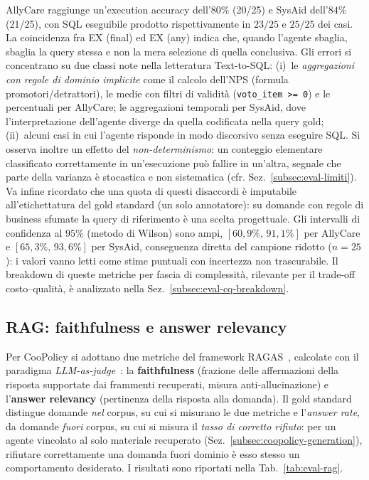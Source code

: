 AllyCare raggiunge un'execution accuracy dell'$80\%$ (20/25) e SysAid dell'$84\%$ (21/25), con SQL eseguibile prodotto rispettivamente in $23/25$ e $25/25$ dei casi. 
La coincidenza fra EX (final) ed EX (any) indica che, quando l'agente sbaglia, sbaglia la query stessa e non la mera selezione di quella conclusiva. 
Gli errori si concentrano su due classi note nella letteratura Text-to-SQL: (i)~le \emph{aggregazioni con regole di dominio implicite} come 
il calcolo dell'NPS (formula promotori/detrattori), le medie con filtri di validità (\texttt{voto\_item >= 0}) e le percentuali per AllyCare; 
le aggregazioni temporali per SysAid, dove l'interpretazione dell'agente diverge da quella codificata nella query gold; 
(ii)~alcuni casi in cui l'agente risponde in modo discorsivo senza eseguire SQL. Si osserva inoltre un effetto del \emph{non-determinismo}: 
un conteggio elementare classificato correttamente in un'esecuzione può fallire in un'altra, segnale che parte della varianza è stocastica e non sistematica 
(cfr. Sez.~\ref{subsec:eval-limiti}). Va infine ricordato che una quota di questi disaccordi è imputabile all'etichettatura del gold standard (un solo annotatore): 
su domande con regole di business sfumate la query di riferimento è una scelta progettuale. Gli intervalli di confidenza al $95\%$ (metodo di Wilson) sono ampi, $[60{,}9\%,\,91{,}1\%]$ per AllyCare
e $[65{,}3\%,\,93{,}6\%]$ per SysAid, conseguenza diretta del campione ridotto ($n=25$): i valori vanno letti come stime puntuali con incertezza non trascurabile.
Il breakdown di queste metriche per fascia di complessità, rilevante per il trade-off costo--qualità, è analizzato nella Sez.~\ref{subsec:eval-cq-breakdown}.

\subsection{RAG: faithfulness e answer relevancy}
\label{subsec:eval-rag}

Per CooPolicy si adottano due metriche del framework RAGAS~\cite{es2023ragas}, calcolate con il paradigma \emph{LLM-as-judge}~\cite{zheng2023llmjudge}: 
la \textbf{faithfulness} (frazione delle affermazioni della risposta supportate dai frammenti recuperati, misura anti-allucinazione) e l'\textbf{answer relevancy} 
(pertinenza della risposta alla domanda). Il gold standard distingue domande \emph{nel} corpus, su cui si misurano le due metriche e l'\emph{answer rate}, 
da domande \emph{fuori} corpus, su cui si misura il \emph{tasso di corretto rifiuto}: per un agente vincolato al solo materiale recuperato (Sez.~\ref{subsec:coopolicy-generation}), 
rifiutare correttamente una domanda fuori dominio è esso stesso un comportamento desiderato.
I risultati sono riportati nella Tab.~\ref{tab:eval-rag}.

